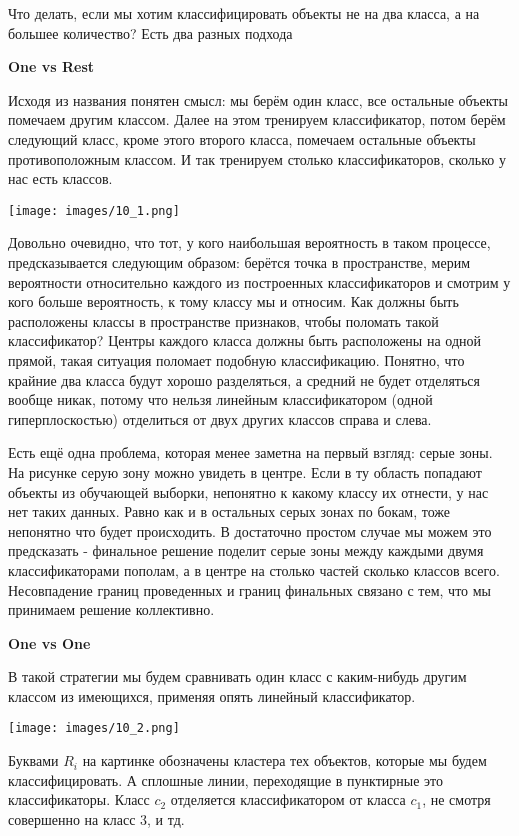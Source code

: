 Что делать, если мы хотим классифицировать объекты не на два класса, а на большее количество? Есть два разных подхода

\textbf{One vs Rest}

Исходя из названия понятен смысл: мы берём один класс, все остальные объекты помечаем другим классом.
Далее на этом тренируем классификатор, потом берём следующий класс, кроме этого второго класса, помечаем
остальные объекты противоположным классом. И так тренируем столько классификаторов, сколько у нас есть
классов.

\texttt{[image: images/10\_1.png]}

Довольно очевидно, что тот, у кого наибольшая вероятность в таком процессе, предсказывается следующим
образом: берётся точка в пространстве, мерим вероятности относительно каждого из построенных классификаторов и смотрим у кого больше вероятность, к тому классу мы и относим. Как должны быть расположены
классы в пространстве признаков, чтобы поломать такой классификатор?
Центры каждого класса должны быть расположены на одной прямой, такая ситуация поломает подобную
классификацию.
Понятно, что крайние два класса будут хорошо разделяться, а средний не будет отделяться вообще никак,
потому что нельзя линейным классификатором (одной гиперплоскостью) отделиться от двух других классов
справа и слева.

Есть ещё одна проблема, которая менее заметна на первый взгляд: серые зоны. На рисунке серую зону
можно увидеть в центре. Если в ту область попадают объекты из обучающей выборки, непонятно к какому
классу их отнести, у нас нет таких данных. Равно как и в остальных серых зонах по бокам, тоже непонятно
что будет происходить. В достаточно простом случае мы можем это предсказать - финальное решение поделит
серые зоны между каждыми двумя классификаторами пополам, а в центре на столько частей сколько классов
всего. Несовпадение границ проведенных и границ финальных связано с тем, что мы принимаем решение
коллективно.

\textbf{One vs One}

В такой стратегии мы будем сравнивать один класс с каким-нибудь другим классом из имеющихся, применяя
опять линейный классификатор. 

\texttt{[image: images/10\_2.png]}

Буквами $R_i$ на картинке обозначены кластера тех объектов, которые мы будем классифицировать. А сплошные линии, переходящие в пунктирные это классификаторы. Класс $c_2$
отделяется классификатором от класса $c_1$, не смотря совершенно на класс 3, и тд.

